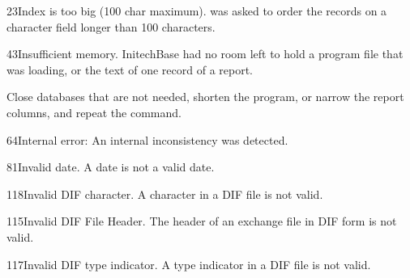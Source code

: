 \begin{XbaseMessageEntry}{23}{Index is too big (100 char maximum).}
 was asked to order the records on a character field longer than 100 characters.
\end{XbaseMessageEntry}

\begin{XbaseMessageEntry}{43}{Insufficient memory.}
InitechBase had no room left to hold a program file that  was loading, or the text of one record of a report.

Close databases that are not needed, shorten the program, or narrow the report columns, and repeat the command.
\end{XbaseMessageEntry}

\begin{XbaseMessageEntry}{64}{Internal error:}
An internal inconsistency was detected.
\end{XbaseMessageEntry}

\begin{XbaseMessageEntry}{81}{Invalid date.}
A date is not a valid date.
\end{XbaseMessageEntry}

\begin{XbaseMessageEntry}{118}{Invalid DIF character.}
A character in a DIF file is not valid.
\end{XbaseMessageEntry}

\begin{XbaseMessageEntry}{115}{Invalid DIF File Header.}
The header of an exchange file in DIF form is not valid.
\end{XbaseMessageEntry}

\begin{XbaseMessageEntry}{117}{Invalid DIF type indicator.}
A type indicator in a DIF file is not valid.
\end{XbaseMessageEntry}

